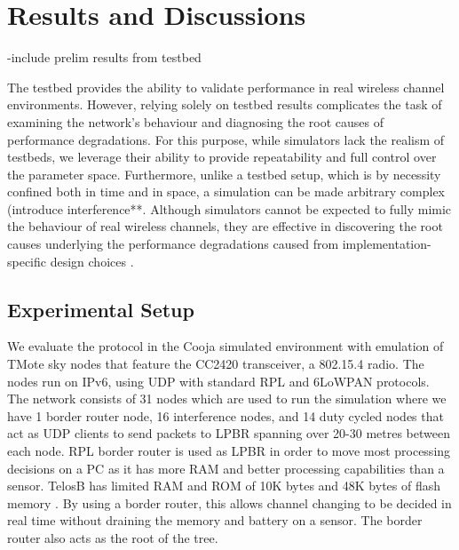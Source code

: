 \chapter{Results and Discussions}
\label{results}

-include prelim results from testbed

The testbed provides the ability to validate performance in real wireless channel environments. However, relying solely on testbed results complicates the task of examining the network's behaviour and diagnosing the root causes of performance degradations. For this purpose, while simulators lack the realism of testbeds, we leverage their ability to provide repeatability and full control over the parameter space. Furthermore, unlike a testbed setup, which is by necessity confined both in time and in space, a simulation can be made arbitrary complex (introduce interference**. Although simulators cannot be expected to fully mimic the behaviour of real wireless channels, they are effective in discovering the root causes underlying the performance degradations caused from implementation-specific design choices \cite{beyondInteroperability}.

\section{Experimental Setup}
We evaluate the protocol in the  Cooja simulated environment with emulation of TMote sky nodes that feature the CC2420 transceiver, a 802.15.4 radio. The nodes run on IPv6, using UDP with standard RPL and 6LoWPAN protocols. The network consists of 31 nodes which are used to run the simulation where we have 1 border router node, 16 interference nodes, and 14 duty cycled nodes that act as UDP clients to send packets to LPBR spanning over 20-30 metres between each node. RPL border router is used as LPBR in order to move most processing decisions on a PC as it has more RAM and better processing capabilities than a sensor. TelosB has limited RAM and ROM of 10K bytes and 48K bytes of flash memory \cite{telosb-datasheet}. By using a border router, this allows channel changing to be decided in real time without draining the memory and battery on a sensor. The border router also acts as the root of the tree.

